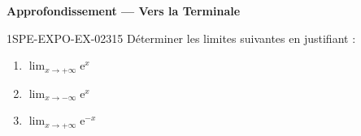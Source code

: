 \begin{center}\textbf{Approfondissement — Vers la Terminale}\end{center}
\begin{exercice}{1SPE-EXPO-EX-023}{1}{5}
Déterminer les limites suivantes en justifiant :
\begin{enumerate}
  \item $\displaystyle\lim_{x \to +\infty} \mathrm{e}^x$
  \item $\displaystyle\lim_{x \to -\infty} \mathrm{e}^x$
  \item $\displaystyle\lim_{x \to +\infty} \mathrm{e}^{-x}$
\end{enumerate}
\end{exercice}
